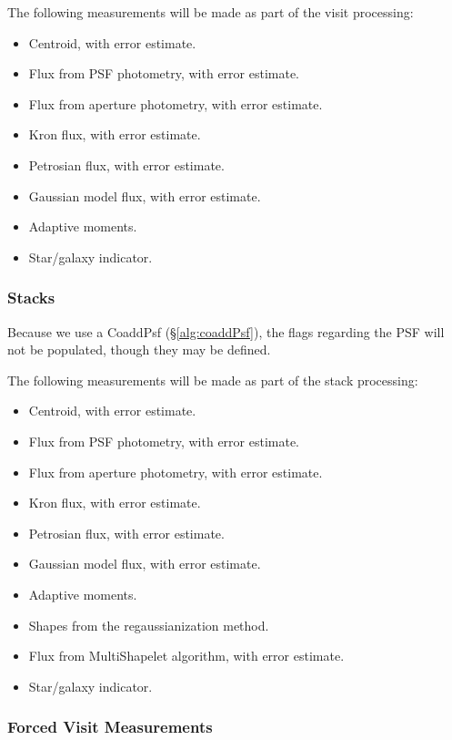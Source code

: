 \documentclass[12pt]{article}
\begin{document}
The following measurements will be made as part of the visit processing:
\begin{itemize}
\item Centroid, with error estimate.
\item Flux from PSF photometry, with error estimate.
\item Flux from aperture photometry, with error estimate.
\item Kron flux, with error estimate.
\item Petrosian flux, with error estimate.
\item Gaussian model flux, with error estimate.
\item Adaptive moments.
\item Star/galaxy indicator.
\end{itemize}

\subsubsection{Stacks}

Because we use a CoaddPsf (\S\ref{alg:coaddPsf}), the flags regarding the PSF will not be populated, though
they may be defined.

The following measurements will be made as part of the stack processing:
\begin{itemize}
\item Centroid, with error estimate.
\item Flux from PSF photometry, with error estimate.
\item Flux from aperture photometry, with error estimate.
\item Kron flux, with error estimate.
\item Petrosian flux, with error estimate.
\item Gaussian model flux, with error estimate.
\item Adaptive moments.
\item Shapes from the regaussianization method.
\item Flux from MultiShapelet algorithm, with error estimate.
\item Star/galaxy indicator.
\end{itemize}

\subsubsection{Forced Visit Measurements}
\end{document}
